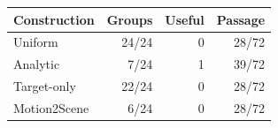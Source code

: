 \begin{tabular}{lrrr}
\toprule
Construction & Groups & Useful & Passage \\
\midrule
Uniform & 24/24 & 0 & 28/72 \\
Analytic & 7/24 & 1 & 39/72 \\
Target-only & 22/24 & 0 & 28/72 \\
Motion2Scene & 6/24 & 0 & 28/72 \\
\bottomrule
\end{tabular}
